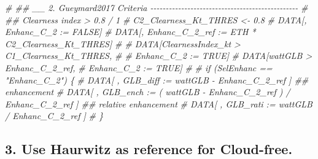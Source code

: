 \documentclass[
  10pt,
  a4paper,oneside]{article}
\newenvironment{Shaded}{\begin{snugshade}}{\end{snugshade}}
\newcommand{\CommentTok}[1]{\textcolor[rgb]{0.56,0.35,0.01}{\textit{#1}}}
\begin{document}
\begin{Shaded}
\begin{Highlighting}[]
\CommentTok{\# \#\# \_\_ 2. Gueymard2017 Criteria  {-}{-}{-}{-}{-}{-}{-}{-}{-}{-}{-}{-}{-}{-}{-}{-}{-}{-}{-}{-}{-}{-}{-}{-}{-}{-}{-}{-}{-}{-}{-}{-}{-}{-}{-}{-}{-}{-}{-}{-}{-}{-}{-}{-}{-}{-}{-}{-}}
\CommentTok{\# \#\# Clearness index \textgreater{} 0.8 / 1}
\CommentTok{\# C2\_Clearness\_Kt\_THRES \textless{}{-} 0.8}
\CommentTok{\# DATA[, Enhanc\_C\_2 := FALSE]}
\CommentTok{\# DATA[, Enhanc\_C\_2\_ref := ETH * C2\_Clearness\_Kt\_THRES]}
\CommentTok{\# \# DATA[ClearnessIndex\_kt \textgreater{} C1\_Clearness\_Kt\_THRES,}
\CommentTok{\# \#      Enhanc\_C\_2 := TRUE]}
\CommentTok{\# DATA[wattGLB \textgreater{} Enhanc\_C\_2\_ref,}
\CommentTok{\#      Enhanc\_C\_2 := TRUE]}
\CommentTok{\#}
\CommentTok{\# if (SelEnhanc == "Enhanc\_C\_2") \{}
\CommentTok{\#   DATA[ , GLB\_diff :=   wattGLB {-} Enhanc\_C\_2\_ref                    ] \#\# enhancement}
\CommentTok{\#   DATA[ , GLB\_ench := ( wattGLB {-} Enhanc\_C\_2\_ref ) / Enhanc\_C\_2\_ref ] \#\# relative enhancement}
\CommentTok{\#   DATA[ , GLB\_rati :=   wattGLB / Enhanc\_C\_2\_ref                    ]}
\CommentTok{\# \}}
\end{Highlighting}
\end{Shaded}

\hypertarget{use-haurwitz-as-reference-for-cloud-free.}{%
\subsection{3. Use Haurwitz as reference for Cloud-free.}\label{use-haurwitz-as-reference-for-cloud-free.}}
\end{document}
